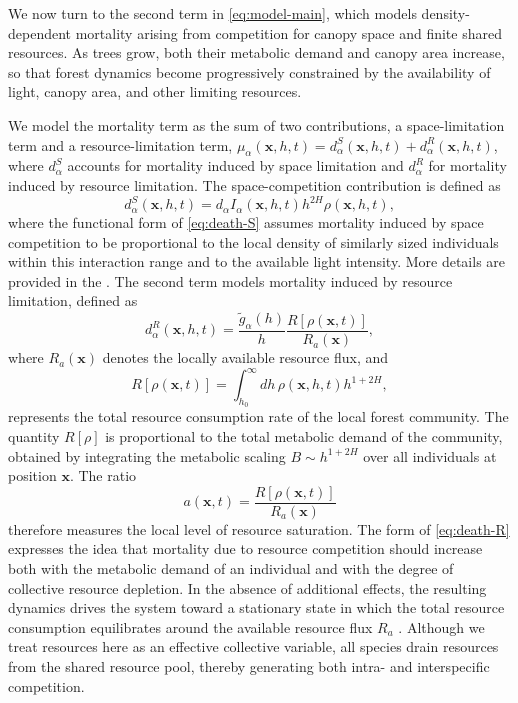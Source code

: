 \documentclass[aps,pre,twocolumn,superscriptaddress,10pt]{revtex4-2}
\begin{document}
We now turn to the second term in \cref{eq:model-main}, which models density-dependent mortality arising from competition for canopy space and finite shared resources. As trees grow, both their metabolic demand and canopy area increase, so that forest dynamics become progressively constrained by the availability of light, canopy area, and other limiting resources.

We model the mortality term as the sum of two contributions, a space-limitation term and a resource-limitation term, $\mu_{\alpha}(\mathbf{x},h,t) = d_{\alpha}^S(\mathbf{x},h,t) + d_{\alpha}^R(\mathbf{x},h,t)$, where $d_\alpha^S$ accounts for mortality induced by space limitation and $d_\alpha^R$ for mortality induced by resource limitation. The space-competition contribution is defined as
\begin{equation}
d_{\alpha}^S(\mathbf{x},h,t) = d_{\alpha} I_\alpha(\mathbf{x}, h, t) h^{2H} \rho(\mathbf{x},h,t),
\label{eq:death-S}
\end{equation}
where the functional form of \cref{eq:death-S} assumes mortality induced by space competition to be proportional to the local density of similarly sized individuals within this interaction range and to the available light intensity. More details are provided in the \MM{}.
The second term models mortality induced by resource limitation, defined as
\begin{equation}
d_{\alpha}^R(\mathbf{x},h,t) = \frac{\tilde{g}_{\alpha}(h)}{h} \frac{R\left[ \rho(\mathbf{x},t) \right]}{R_a(\mathbf{x})},
\label{eq:death-R}
\end{equation}
where $R_a(\mathbf{x})$ denotes the locally available resource flux, and
\begin{equation}
R\left[ \rho(\mathbf{x},t) \right]= \int_{h_0}^{\infty}\! dh\, \rho(\mathbf{x},h,t) h^{1+2H},
\label{eq:resources}
\end{equation}
represents the total resource consumption rate of the local forest community.
The quantity $R[\rho]$ is proportional to the total metabolic demand of the community, obtained by integrating the metabolic scaling $B\sim h^{1+2H}$ over all individuals at position $\mathbf{x}$. The ratio
\begin{equation}\label{eq:a}
a(\mathbf{x},t) = \frac{R[\rho(\mathbf{x},t)]}{R_a(\mathbf{x})}
\end{equation}
therefore measures the local level of resource saturation. The form of \cref{eq:death-R} expresses the idea that mortality due to resource competition should increase both with the metabolic demand of an individual and with the degree of collective resource depletion.
In the absence of additional effects, the resulting dynamics drives the system toward a stationary state in which the total resource consumption equilibrates around the available resource flux $R_a$ \MMnoref. Although we treat resources here as an effective collective variable, all species drain resources from the shared resource pool, thereby generating both intra- and interspecific competition.
\end{document}
